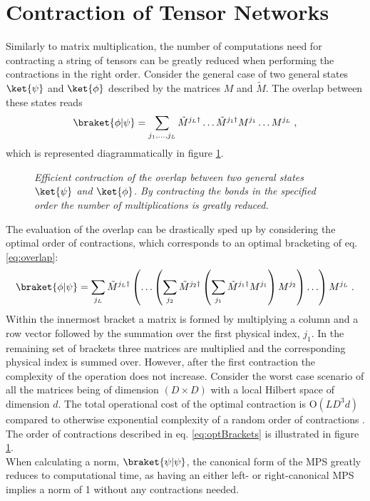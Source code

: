 \section*{Contraction of Tensor Networks}
Similarly to matrix multiplication, the number of computations need for contracting a string of tensors can be greatly reduced when performing the contractions in the right order. Consider the general case of two general states $\ket{\psi}$ and $\ket{\phi}$ described by the matrices $M$ and $\tilde{M}$. The overlap between these states reads
\begin{equation}
	\braket{\phi | \psi} = \sum_{j_1 , \ldots , j_L} \tilde{M}^{j_L \dag} \ldots \tilde{M}^{j_1 \dag} M^{j_1} \ldots M^{j_L} \; , 
	\label{eq:overlap}
\end{equation}
which is represented diagrammatically in figure \ref{fig:effCont}.
\begin{figure}[h!]
	\centering
	
	\caption{\textit{Efficient contraction of the overlap between two general states $\ket{\psi}$ and $\ket{\phi}$. By contracting the bonds in the specified order the number of multiplications is greatly reduced.}}
	\label{fig:effCont}
\end{figure}
The evaluation of the overlap can be drastically sped up by considering the optimal order of contractions, which corresponds to an optimal bracketing of eq. \eqref{eq:overlap}:
\begin{equation}
	\braket{\phi | \psi} = \sum_{j_L} \tilde{M}^{j_L \dag} \left( \ldots \left( \sum_{j_2} \tilde{M}^{j_2 \dag} \left( \sum_{j_1} \tilde{M}^{j_1 \dag} M^{j_1} \right) M^{j_2} \right) \ldots \right) M^{j_L} \; .
	\label{eq:optBrackets}
\end{equation}  
Within the innermost bracket a matrix is formed by multiplying a column and a row vector followed by the summation over the first physical index, $j_1$. In the remaining set of brackets three matrices are multiplied and the corresponding physical index is summed over. However, after the first contraction the complexity of the operation does not increase. Consider the worst case scenario of all the matrices being of dimension $(D \times D)$ with a local Hilbert space of dimension $d$. The total operational cost of the optimal contraction is $\mathrm{O}(L D^3 d)$ compared to otherwise exponential complexity of a random order of contractions \cite{schollwock}. The order of contractions described in eq. \eqref{eq:optBrackets} is illustrated in figure \ref{fig:effCont}.\\
When calculating a norm, $\braket{\psi | \psi}$, the canonical form of the MPS greatly reduces to computational time, as having an either left- or right-canonical MPS implies a norm of 1 without any contractions needed.